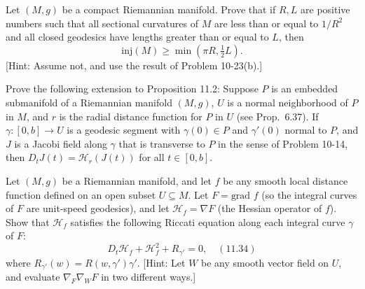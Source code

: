 \begin{exercise}\label{prob:injectivity-radius-comparison}
Let $(M, g)$ be a compact Riemannian manifold. Prove that if $R, L$ are positive numbers such that all sectional curvatures of $M$ are less than or equal to $1/R^2$ and all closed geodesics have lengths greater than or equal to $L$, then
\[
\text{inj}(M) \geq \min(\pi R, \tfrac{1}{2}L).
\]
[Hint: Assume not, and use the result of Problem 10-23(b).]
\end{exercise}

\begin{exercise}
\label{prob:jacobi-field-submanifold}

Prove the following extension to Proposition 11.2: Suppose $P$ is an embedded submanifold of a Riemannian manifold $(M,g)$, $U$ is a normal neighborhood of $P$ in $M$, and $r$ is the radial distance function for $P$ in $U$ (see Prop.\ 6.37). If $\gamma : [0,b] \to U$ is a geodesic segment with $\gamma(0) \in P$ and $\gamma'(0)$ normal to $P$, and $J$ is a Jacobi field along $\gamma$ that is transverse to $P$ in the sense of Problem 10-14, then $D_t J(t) = \mathcal{H}_r(J(t))$ for all $t \in [0,b]$.
\end{exercise}

\begin{exercise}\label{prob:riccati-equation}
Let $(M, g)$ be a Riemannian manifold, and let $f$ be any smooth local distance function defined on an open subset $U \subseteq M$. Let $F = \text{grad } f$ (so the integral curves of $F$ are unit-speed geodesics), and let $\mathcal{H}_f = \nabla F$ (the Hessian operator of $f$). Show that $\mathcal{H}_f$ satisfies the following Riccati equation along each integral curve $\gamma$ of $F$:
\[
D_t \mathcal{H}_f + \mathcal{H}_f^2 + R_{\gamma'} = 0, \quad (11.34)
\]
where $R_{\gamma'}(w) = R(w, \gamma')\gamma'$. [Hint: Let $W$ be any smooth vector field on $U$, and evaluate $\nabla_F \nabla_W F$ in two different ways.]
\end{exercise}

